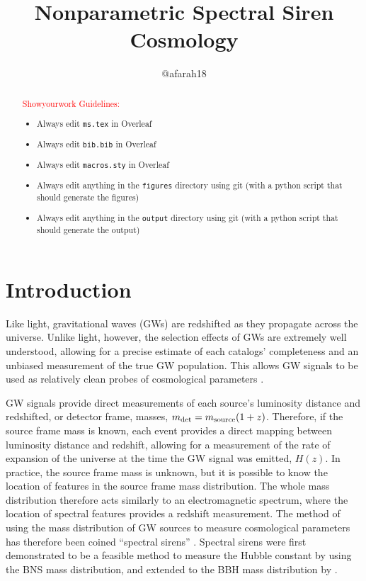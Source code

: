 \documentclass[]{aastex631}
\begin{document}
\title{Nonparametric Spectral Siren Cosmology}

\author{@afarah18}

\begin{abstract}
    \textcolor{red}{Showyourwork Guidelines:}
    \begin{itemize}
        \item Always edit \texttt{ms.tex} in Overleaf
        \item Always edit \texttt{bib.bib} in Overleaf
        \item Always edit \texttt{macros.sty} in Overleaf
        \item Always edit anything in the \texttt{figures} directory using git (with a python script that should generate the figures)
        \item Always edit anything in the \texttt{output} directory using git (with a python script that should generate the output)
    \end{itemize}
\end{abstract}

\section{Introduction}
\label{sec:intro}
Like light, gravitational waves (GWs) are redshifted as they propagate across the universe.
Unlike light, however, the selection effects of GWs are extremely well understood, allowing for a precise estimate of each catalogs' completeness and an unbiased measurement of the true GW population.
This allows GW signals to be used as relatively clean probes of cosmological parameters \citep[e.g.][]{bright sirens first paper, 170817 bright siren, dark siren first paper, dark siren with 0817, hithhikers guide}.

GW signals provide direct measurements of each source's luminosity distance and redshifted, or detector frame, masses, $m_{\det}= m_{\text{source}}(1+z)$.
Therefore, if the source frame mass is known, each event provides a direct mapping between luminosity distance and redshift, allowing for a measurement of the rate of expansion of the universe at the time the GW signal was emitted, $H(z)$.
In practice, the source frame mass is unknown, but it is possible to know the location of features in the source frame mass distribution.
The whole mass distribution therefore acts similarly to an electromagnetic spectrum, where the location of spectral features provides a redshift measurement.
The method of using the mass distribution of GW sources to measure cosmological parameters has therefore been coined ``spectral sirens'' \citep{ezquiaga_spectral_2022}.
Spectral sirens were first demonstrated to be a feasible method to measure the Hubble constant by \cite{chernoff+fin} using the BNS mass distribution, and extended to the BBH mass distribution by \cite{farr_future_2019}.
\end{document}
